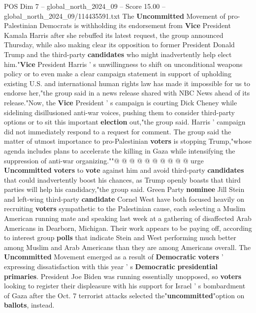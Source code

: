 \begin{textsample}{POS Dim 7 – global\_north\_2024\_09 – Score 15.00 – global\_north\_2024\_09/114435591.txt}  \label{ex:f7_pos_071}
The \textbf{Uncommitted} Movement of pro-Palestinian Democrats is withholding its endorsement from \textbf{Vice} President Kamala Harris after she rebuffed its latest request, the group announced Thursday, while also making clear its opposition to former President Donald Trump and the third-party \textbf{candidates} who might inadvertently help elect him."\textbf{Vice} President Harris ' s unwillingness to shift on unconditional weapons policy or to even make a clear campaign statement in support of upholding existing U.S. and international human rights law has made it impossible for us to endorse her,"the group said in a news release shared with NBC News ahead of its release."Now, the \textbf{Vice} President ' s campaign is courting Dick Cheney while sidelining disillusioned anti-war voices, pushing them to consider third-party options or to sit this important \textbf{election} out,"the group said.
Harris ' campaign did not immediately respond to a request for comment.
The group said the matter of utmost importance to pro-Palestinian \textbf{voters} is stopping Trump,"whose agenda includes plans to accelerate the killing in Gaza while intensifying the suppression of anti-war organizing.""@ @ @ @ @ @ @ @ @ @ urge \textbf{Uncommitted} \textbf{voters} to \textbf{vote} against him and avoid third-party \textbf{candidates} that could inadvertently boost his chances, as Trump openly boasts that third parties will help his candidacy,"the group said.
Green Party \textbf{nominee} Jill Stein and left-wing third-party \textbf{candidate} Cornel West have both focused heavily on recruiting \textbf{voters} sympathetic to the Palestinian cause, each selecting a Muslim American running mate and speaking last week at a gathering of disaffected Arab Americans in Dearborn, Michigan.
Their work appears to be paying off, according to interest group \textbf{polls} that indicate Stein and West performing much better among Muslim and Arab Americans than they are among Americans overall.
The \textbf{Uncommitted} Movement emerged as a result of \textbf{Democratic} \textbf{voters} ' expressing dissatisfaction with this year ' s \textbf{Democratic} \textbf{presidential} \textbf{primaries}.
President Joe Biden was running essentially unopposed, so \textbf{voters} looking to register their displeasure with his support for Israel ' s bombardment of Gaza after the Oct. 7 terrorist attacks selected the"\textbf{uncommitted}"option on \textbf{ballots}, instead.

\end{textsample}
